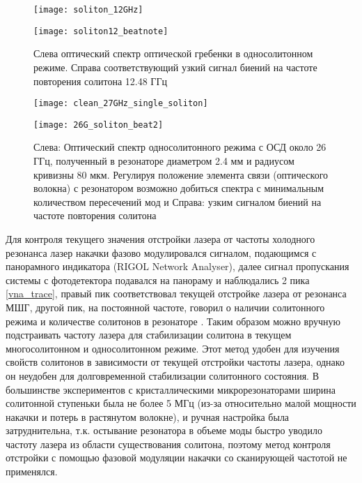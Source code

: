 \begin{figure}[ht]
  \begin{minipage}[ht]{0.49\linewidth}\centering
    \texttt{[image: soliton\_12GHz]}
  \end{minipage}
  \hfill
  \begin{minipage}[ht]{0.49\linewidth}\centering
    \texttt{[image: soliton12\_beatnote]}
  \end{minipage}
  \caption{Слева оптический спектр оптической гребенки в односолитонном режиме. Справа соответствующий узкий сигнал биений на частоте повторения солитона 12.48 ГГц}
  \label{soliton_12GHz}
\end{figure}


\begin{figure}[ht]
  \begin{minipage}[ht]{0.49\linewidth}\centering
    \texttt{[image: clean\_27GHz\_single\_soliton]}
  \end{minipage}
  \hfill
  \begin{minipage}[ht]{0.49\linewidth}\centering
    \texttt{[image: 26G\_soliton\_beat2]}
  \end{minipage}
  \caption{Слева: Оптический спектр односолитонного режима с ОСД около 26 ГГц, полученный в резонаторе диаметром 2.4 мм и радиусом кривизны 80 мкм. Регулируя положение элемента связи (оптического волокна) с резонатором возможно добиться спектра с минимальным количеством пересечений мод и Справа: узким сигналом биений на частоте повторения солитона }
  \label{clean_27GHz_single_soliton}
\end{figure}


\begin{figure}[ht]
\centering
  
  
\end{figure}

Для контроля текущего значения отстройки лазера от частоты холодного резонанса лазер накачки фазово модулировался сигналом, подающимся с панорамного индикатора (RIGOL Network Analyser), далее сигнал пропускания системы с фотодетектора подавался на панораму и наблюдались 2 пика \ref{vna_trace}, правый пик соответствовал текущей отстройке лазера от резонанса МШГ, другой пик, на постоянной частоте, говорил о наличии солитонного режима и количестве солитонов в резонаторе \cite{Karpov2017}. Таким образом можно вручную подстраивать частоту лазера для стабилизации солитона в текущем многосолитонном и односолитонном режиме. Этот метод удобен для изучения свойств солитонов в зависимости от текущей отстройки частоты лазера, однако он неудобен для долговременной стабилизации солитонного состояния. В большинстве экспериментов с кристаллическими микрорезонаторами ширина солитонной ступеньки была не более 5 МГц (из-за относительно малой мощности накачки и потерь в растянутом волокне), и ручная настройка была затруднительна, т.к. остывание резонатора в объеме моды быстро уводило частоту лазера из области существования солитона, поэтому метод контроля отстройки с помощью фазовой модуляции накачки со сканирующей частотой не применялся.

